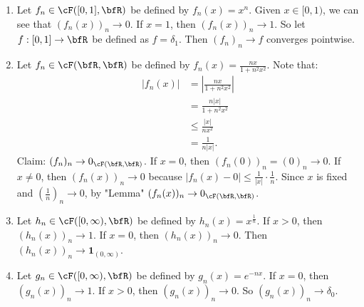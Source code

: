     \begin{example}
        \phantom{a}
        \begin{enumerate}[label = (\arabic*)]
            \item Let $f_n \in \cF([0,1],\bfR)$ be defined by $f_n(x) = x^n$. Given $x \in [0,1)$, we can see that $(f_n(x))_n \rightarrow 0$. If $x = 1$, then $(f_n(x))_n \rightarrow 1$. So let $f: [0,1] \rightarrow \bfR$ be defined as $f = \delta_1$. Then $(f_n)_n \rightarrow f$ converges pointwise.
            \item Let $f_n \in \cF(\bfR,\bfR)$ be defined by $f_n(x) = \frac{nx}{1+n^2x^2}$. Note that:
                \begin{equation*}
                \begin{split}
                    |f_n(x)|
                    & = \left|\frac{nx}{1+n^2x^2}\right| \\
                    & = \frac{n|x|}{1 + n^2 x^2} \\
                    & \leq \frac{|x|}{nx^2} \\
                    & = \frac{1}{n|x|}. 
                \end{split}
                \end{equation*}
            Claim: $(f_n)_n \rightarrow 0_{\cF(\bfR, \bfR)}$. If $x = 0$, then $(f_n(0))_n = (0)_n \rightarrow 0$. If $x \neq 0$, then $(f_n(x))_n \rightarrow 0$ because $|f_n(x) - 0| \leq \frac{1}{|x|} \cdot \frac{1}{n}$. Since $x$ is fixed and $\left(\frac{1}{n}\right)_n \rightarrow 0$, by "Lemma" $(f_n(x))_n \rightarrow 0_{\cF(\bfR,\bfR)}$.
            \item Let $h_n \in \cF([0,\infty),\bfR)$ be defined by $h_n(x) = x^\frac{1}{n}$. If $x > 0$, then $(h_n(x))_n \rightarrow 1$. If $x = 0$, then $(h_n(x))_n \rightarrow 0$. Then $(h_n(x))_n \rightarrow \mathbf{1}_{(0,\infty)}$.
            \item Let $g_n \in \cF([0,\infty),\bfR)$ be defined by $g_n(x) = e^{-nx}$. If $x = 0$, then $(g_n(x))_n \rightarrow 1$. If $x > 0$, then $(g_n(x))_n \rightarrow 0$. So $(g_n(x))_n \rightarrow \delta_0$.
        \end{enumerate}
    \end{example}

